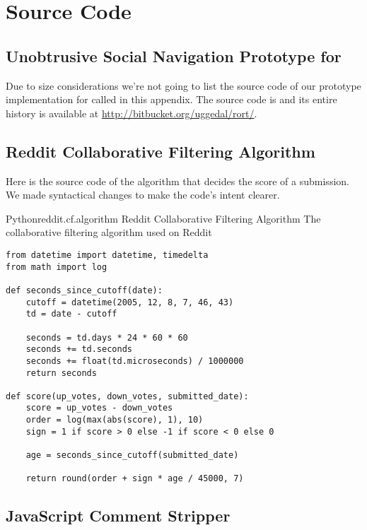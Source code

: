 \chapter{Source Code}

\section{Unobtrusive Social Navigation Prototype for \urort{}}

Due to size considerations we're not going to list the source code of our
prototype implementation for \urort{} called \latest{} in this appendix.
The source code is and its entire history is available at
\url{http://bitbucket.org/uggedal/rort/}.

\section{Reddit Collaborative Filtering Algorithm}
\label{section:source.code.reddit}

Here is the source code of the algorithm that decides the score of a
submission. We made syntactical changes to make the code's intent clearer.

\begin{scode}{Python}{reddit.cf.algorithm}{%
  Reddit Collaborative Filtering Algorithm}{%
  The collaborative filtering algorithm used on Reddit}
\begin{lstlisting}
from datetime import datetime, timedelta
from math import log

def seconds_since_cutoff(date):
    cutoff = datetime(2005, 12, 8, 7, 46, 43)
    td = date - cutoff

    seconds = td.days * 24 * 60 * 60
    seconds += td.seconds
    seconds += float(td.microseconds) / 1000000
    return seconds

def score(up_votes, down_votes, submitted_date):
    score = up_votes - down_votes
    order = log(max(abs(score), 1), 10)
    sign = 1 if score > 0 else -1 if score < 0 else 0

    age = seconds_since_cutoff(submitted_date)

    return round(order + sign * age / 45000, 7)
\end{lstlisting}
\end{scode}


\section{JavaScript Comment Stripper}
\label{section:source.code.javascript.comment.stripper}

